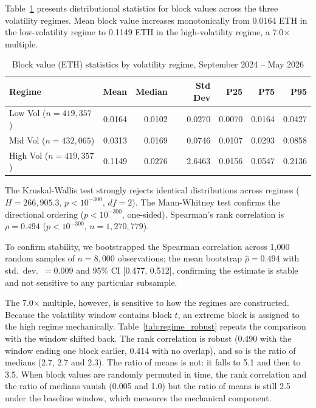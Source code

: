 \documentclass[11pt]{article}
\begin{document}
Table~\ref{tab:regimes} presents distributional statistics for block values
across the three volatility regimes. Mean block value increases monotonically
from 0.0164 ETH in the low-volatility regime to 0.1149 ETH in the
high-volatility regime, a 7.0$\times$ multiple.

\begin{table}[!htbp]
\centering
\caption{Block value (ETH) statistics by volatility regime, September 2024 -- May 2026}
\label{tab:regimes}
\begin{tabular}{lrrrrrr}
\toprule
Regime & Mean & Median & Std Dev & P25 & P75 & P95 \\
\midrule
Low Vol ($n = 419{,}357$) & 0.0164 & 0.0102 & 0.0270 & 0.0070 & 0.0164 & 0.0427 \\
Mid Vol ($n = 432{,}065$) & 0.0313 & 0.0169 & 0.0746 & 0.0107 & 0.0293 & 0.0858 \\
High Vol ($n = 419{,}357$) & 0.1149 & 0.0276 & 2.6463 & 0.0156 & 0.0547 & 0.2136 \\
\bottomrule
\end{tabular}
\end{table}

The Kruskal-Wallis test strongly rejects identical distributions across regimes
($H = 266{,}905.3$, $p < 10^{-300}$, $df = 2$). The Mann-Whitney test confirms
the directional ordering ($p < 10^{-300}$, one-sided). Spearman's rank
correlation is $\rho = 0.494$ ($p < 10^{-300}$, $n = 1{,}270{,}779$).

To confirm stability, we bootstrapped the Spearman correlation across 1,000
random samples of $n = 8{,}000$ observations; the mean bootstrap $\hat\rho =
0.494$ with std.\ dev.\ $= 0.009$ and 95\% CI [0.477, 0.512], confirming the
estimate is stable and not sensitive to any particular subsample.

The 7.0$\times$ multiple, however, is sensitive to how the regimes are
constructed. Because the volatility window contains block $t$, an extreme
block is assigned to the high regime mechanically.
Table~\ref{tab:regime_robust} repeats the comparison with the window shifted
back. The rank correlation is robust (0.490 with the window ending one block
earlier, 0.414 with no overlap), and so is the ratio of medians (2.7, 2.7 and
2.3). The ratio of means is not: it falls to 5.1 and then to 3.5. When block
values are randomly permuted in time, the rank correlation and the ratio of
medians vanish (0.005 and 1.0) but the ratio of means is still 2.5 under the
baseline window, which measures the mechanical component.
\end{document}
